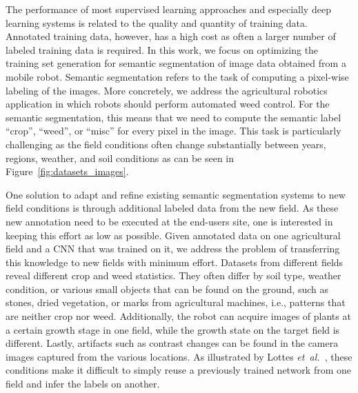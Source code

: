 \documentclass[letterpaper, 10 pt, conference]{ieeeconf}  %
\newcommand\etal{\emph{et~al.}}
\begin{document}
The performance of most supervised learning approaches and especially deep
learning  systems is related to the quality and quantity of training data.
Annotated training data, however, has a high cost as often a larger number of
labeled training data is  required.  In this work, we focus on optimizing the
training set generation for  semantic segmentation of image data obtained
from a mobile robot. Semantic segmentation refers to the task of computing a
pixel-wise  labeling of the images. More concretely, we address the
agricultural robotics  application in which robots should perform automated
weed control. For the semantic  segmentation, this means that we need to
compute the semantic label ``crop'', ``weed'',  or ``misc'' for every pixel in
the image. This task is particularly challenging  as the field conditions
often change substantially between years, regions, weather, and  soil
conditions as can be seen in Figure~\ref{fig:datasets_images}.  

One solution to adapt and refine existing semantic
segmentation systems to new field conditions  is through additional labeled data from the
new field. As these new annotation need to be executed at the end-users site,
one is interested in keeping this effort as low as possible. 
%
Given annotated data on one agricultural field and a CNN that was trained
on it, we address the problem of transferring this knowledge to new fields with
minimum effort.  Datasets from different fields reveal different crop and weed
statistics. They often differ by soil type, weather condition, or
various small objects that can be found  on the ground, such as stones, dried
vegetation, or marks from agricultural machines, i.e., patterns that are
neither crop nor weed. Additionally, the robot can acquire  images of plants
at a certain growth stage in one field, while the growth state on the  target
field is different. Lastly, artifacts such as contrast changes can be found in
the camera images captured from the various locations.  As illustrated by 
Lottes \etal~\cite{lottes2018ral,lottes2017iros}, these conditions make
it difficult to simply reuse a previously trained network from one  field and
infer the labels on another. 
\end{document}

